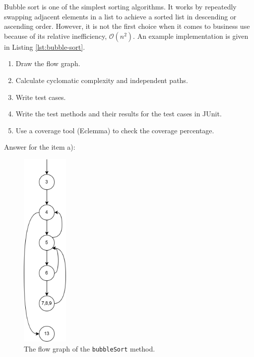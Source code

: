 \begin{exercise}
    Bubble sort is one of the simplest sorting algorithms. It works by repeatedly swapping adjacent elements in a list to achieve a sorted list in descending or ascending order. However, it is not the first choice when it comes to business use because of its relative inefficiency, $\mathcal{O}(n^2)$. An example implementation is given in Listing \ref{lst:bubble-sort}.
    
    
    
    \begin{enumerate}
        \item Draw the flow graph.
        \item Calculate cyclomatic complexity and independent paths.
        \item Write test cases.
        \item Write the test methods and their results for the test cases in JUnit.
        \item Use a coverage tool (Eclemma) to check the coverage percentage.
    \end{enumerate}

    Answer for the item a):
    \begin{figure}[H]
        \centering
        \includegraphics[width=0.2\textwidth]{images/exercise-9a-solution.png}
        \caption{The flow graph of the \lstinline!bubbleSort! method.}
        \label{fig:ex9-fg}
    \end{figure}
    

\end{exercise}
